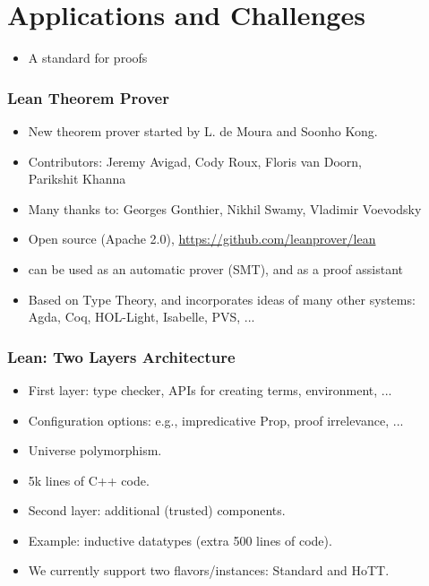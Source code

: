 \documentclass[svgnames,table,mathserif]{beamer}
\begin{document}
\section{Applications and Challenges}

\begin{frame}
  
  \begin{itemize}
    \item A standard for proofs
  \end{itemize}

\end{frame}

\begin{frame}
\frametitle{Lean Theorem Prover}
  \begin{itemize}
    \item New theorem prover started by L. de Moura and Soonho Kong.
    \item {\small Contributors: Jeremy Avigad, Cody Roux, Floris van Doorn,\\ Parikshit Khanna}
    \item {\small Many thanks to: Georges Gonthier, Nikhil Swamy, Vladimir Voevodsky}
  \end{itemize}
  \vspace*{12pt}
  \begin{itemize}
    \item Open source (Apache 2.0), {\small \url{https://github.com/leanprover/lean}}
    \item {\color{red} can be used as an automatic prover (SMT), and as a proof assistant}
    \item Based on {\color{red} Type Theory}, and incorporates ideas of many other systems:\\
        Agda, Coq, HOL-Light, Isabelle, PVS, ...
  \end{itemize}
\end{frame}

\begin{frame}
\frametitle{Lean: Two Layers Architecture}
  \begin{itemize}
     \item {\color{red} First layer}: type checker, APIs for creating terms, environment, ...
     \item Configuration options: e.g., impredicative Prop, proof irrelevance, ...
     \item Universe polymorphism.
     \item 5k lines of C++ code.
  \end{itemize}
  \vspace*{12pt}
  \begin{itemize}
     \item {\color{red} Second layer}: additional (trusted) components.
     \item Example: inductive datatypes (extra 500 lines of code).
     \item We currently support two flavors/instances: {\color{red} Standard} and {\color{red} HoTT}.
  \end{itemize}
\end{frame}
\end{document}
